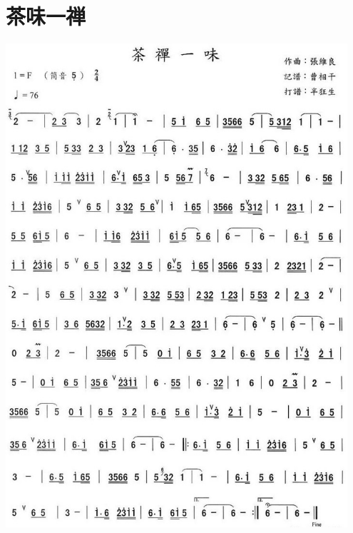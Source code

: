 \documentclass[cn,pad,twocol]{elegantbook}
\begin{document}
\section{茶味一禅}\includegraphics[width=0.95\textwidth]{dongxiao/20200819/茶禅一味.jpeg}
\end{document}
